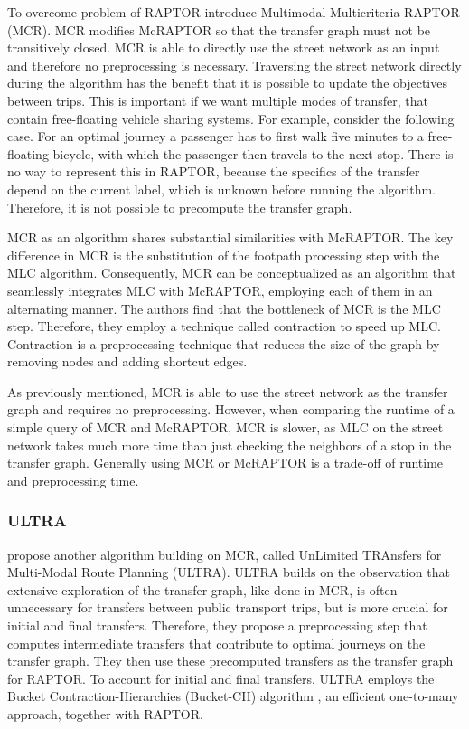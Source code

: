 To overcome problem of RAPTOR \cite{dellingComputingMultimodalJourneys2013} introduce Multimodal Multicriteria RAPTOR (MCR).
MCR modifies McRAPTOR so that the transfer graph must not be transitively closed.
MCR is able to directly use the street network as an input and therefore no preprocessing is necessary.
Traversing the street network directly during the algorithm has the benefit that it is possible to update the objectives between trips.
This is important if we want multiple modes of transfer, that contain free-floating vehicle sharing systems.
For example, consider the following case.
For an optimal journey a passenger has to first walk five minutes to a free-floating bicycle, with which the passenger then travels to the next stop.
There is no way to represent this in RAPTOR, because the specifics of the transfer depend on the current label, which is unknown before running the algorithm.
Therefore, it is not possible to precompute the transfer graph.

MCR as an algorithm shares substantial similarities with McRAPTOR.
The key difference in MCR is the substitution of the footpath processing step with the MLC algorithm.
Consequently, MCR can be conceptualized as an algorithm that seamlessly integrates MLC with McRAPTOR, employing each of them in an alternating manner.
The authors find that the bottleneck of MCR is the MLC step.
Therefore, they employ a technique called contraction  to speed up MLC.
Contraction is a preprocessing technique that reduces the size of the graph by removing nodes and adding shortcut edges.

As previously mentioned, MCR is able to use the street network as the transfer graph and requires no preprocessing.
However, when comparing the runtime of a simple query of MCR and McRAPTOR, MCR is slower, as MLC on the street network takes much more time than just checking the neighbors of a stop in the transfer graph.
Generally using MCR or McRAPTOR is a trade-off of runtime and preprocessing time.


\subsubsection{ULTRA}
\label{subsubsec:ultra}

\cite{baumUnLimitedTRAnsfersMultiModal2019} propose another algorithm building on MCR, called UnLimited TRAnsfers for Multi-Modal Route Planning (ULTRA).
ULTRA builds on the observation that extensive exploration of the transfer graph, like done in MCR, is often unnecessary for transfers between public transport trips, but is more crucial for initial and final transfers.
Therefore, they propose a preprocessing step that computes intermediate transfers that contribute to optimal journeys on the transfer graph.
They then use these precomputed transfers as the transfer graph for RAPTOR.
To account for initial and final transfers, ULTRA employs the Bucket Contraction-Hierarchies (Bucket-CH) algorithm \cite{geisbergerContractionHierarchiesFaster2008}, an efficient one-to-many approach, together with RAPTOR.

